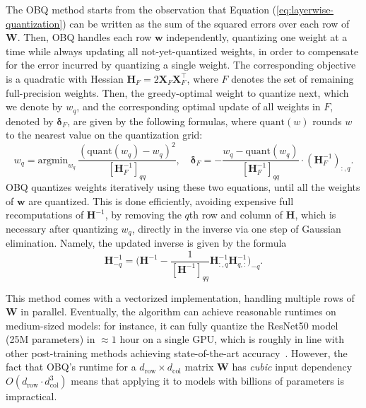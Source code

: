 The OBQ method starts from the observation that Equation (\ref{eq:layerwise-quantization}) can be written as the sum of the squared errors over each row of $\mathbf{W}$. 
Then, OBQ handles each row $\mathbf{w}$ independently, quantizing one weight at a time while always updating all not-yet-quantized weights, in order to compensate for the error incurred by quantizing a single weight. 
The corresponding objective is a quadratic with Hessian $\mathbf{H}_F = 2\mathbf{X}_F\mathbf{X}_F^\top$, where $F$ denotes the set of remaining full-precision weights. Then, the greedy-optimal weight to quantize next, which we denote by $w_q$, and the corresponding optimal update of all weights in $F$, denoted by $\boldsymbol{\delta}_F$, are given by the following formulas, where $\text{quant}(w)$ rounds $w$ to the nearest value on the quantization grid:
\begin{equation}
    \label{eq:obs-quant}
    w_q = \text{argmin}_{w_q} \, \frac{(\text{quant}(w_q) - w_q)^2}{[\mathbf{H}_F^{-1}]_{qq}}, \quad \boldsymbol{\delta}_F = - \frac{w_q - \text{quant}(w_q)}{[\mathbf{H}_F^{-1}]_{qq}} \cdot (\mathbf{H}_F^{-1})_{:, q}.
\end{equation}
OBQ quantizes weights iteratively using these two equations, until all the weights of $\mathbf{w}$  are quantized.
This is done efficiently, avoiding expensive full recomputations of $\mathbf{H}^{-1}$, by removing the $q$th row and column of $\mathbf{H}$, which is necessary after quantizing $w_q$, directly in the inverse via one step of Gaussian elimination. Namely, the updated inverse is given by the formula
\begin{equation}
    \label{eq:inv-update}
    \mathbf{H}_{-q}^{-1} = \Big(\mathbf{H}^{-1} - \frac{1}{[\mathbf{H}^{-1}]_{qq}} \mathbf{H}^{-1}_{:, q} \mathbf{H}^{-1}_{q, :} \Big)_{-q}.
\end{equation}

This method comes with a vectorized implementation, handling multiple rows of $\mathbf{W}$ in parallel. 
Eventually, the algorithm can achieve reasonable runtimes on medium-sized models: for instance, it can fully quantize the  ResNet50 model (25M parameters) in $\approx 1$ hour on a single GPU, which is roughly in line with other post-training methods achieving state-of-the-art accuracy~\cite{frantar2022obc}. 
However, the fact that OBQ's runtime for a $d_\text{row} \times d_\text{col}$ matrix $\mathbf{W}$ has \emph{cubic} input dependency $O(d_\text{row} \cdot d_\text{col}^3)$ means that applying it to models with billions of parameters is impractical.

